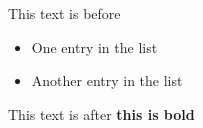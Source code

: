 \documentclass[a4paper]{article}
\begin{document}
  This text is before  

  \begin{itemize}
    \item One entry in the list
    \item Another entry in the list
  \end{itemize}

  This text is after \textbf{this is bold}
\end{document}
